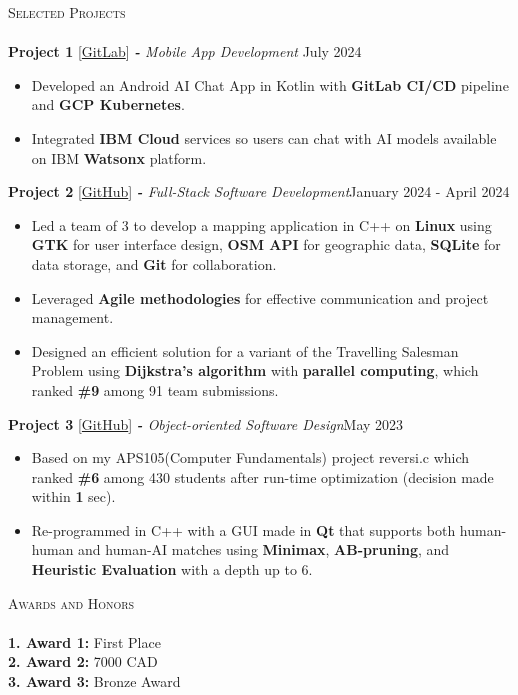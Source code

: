 \documentclass[a4paper]{article}
\newcommand{\lineunder} {
    \vspace*{-8pt} \\
    \hspace*{-18pt} \hrulefill \hspace*{-0.5cm} \\
}
\newcommand{\header} [1] {
    {\hspace*{-18pt}\vspace*{6pt} \textsc{#1}}
    \vspace*{-6pt} \lineunder
}
\begin{document}
\vspace*{2mm}
\header{Selected Projects}
{\textbf{Project 1}} {[\href{https://www.google.com}{GitLab}]} {\sl \textbf{-} Mobile App Development }\hfill July 2024\\
\vspace{-1mm}
\begin{itemize}
    \item  Developed an Android AI Chat App in Kotlin with \textbf{GitLab CI/CD} pipeline and \textbf{GCP Kubernetes}.
    \item Integrated \textbf{IBM Cloud} services so users can chat with AI models available on IBM \textbf{Watsonx} platform.
\end{itemize}
\vspace{2mm}
{\textbf{Project 2}} {[\href{https://www.google.com}{GitHub}]} {\sl \textbf{-} Full-Stack Software Development}\hfill January 2024 - April 2024\\
\vspace{-1mm}
\begin{itemize}
    \item Led a team of 3 to develop a mapping application in C++ on \textbf{Linux} using \textbf{GTK} for user interface design, \textbf{OSM API} for geographic data, \textbf{SQLite} for data storage, and \textbf{Git} for collaboration.
    \item Leveraged \textbf{Agile methodologies} for effective communication and project management.
    \item Designed an efficient solution for a variant of the Travelling Salesman Problem using \textbf{Dijkstra's algorithm} with \textbf{parallel computing}, which ranked \textbf{\#9} among 91 team submissions.
\end{itemize}
\vspace*{2mm}
{\textbf{Project 3}} {[\href{https://www.google.com}{GitHub}]} {\sl \textbf{-} Object-oriented Software Design}\hfill May 2023\\
\vspace{-1mm}
\begin{itemize}
    \item Based on my APS105(Computer Fundamentals) project reversi.c which ranked \textbf{\#6} among 430 students after run-time optimization (decision made within \textbf{1} sec).
    \item Re-programmed in C++ with a GUI made in \textbf{Qt} that supports both human-human and human-AI matches using \textbf{Minimax}, \textbf{AB-pruning}, and \textbf{Heuristic Evaluation} with a depth up to 6.
\end{itemize}
\vspace*{2mm}

\header{Awards and Honors}
\textbf{1. Award 1:} {First Place}\\
\vspace*{2mm}
\textbf{2. Award 2:} {7000 CAD}\\
\vspace*{2mm}
\textbf{3. Award 3:} {Bronze Award}\
\end{document}
